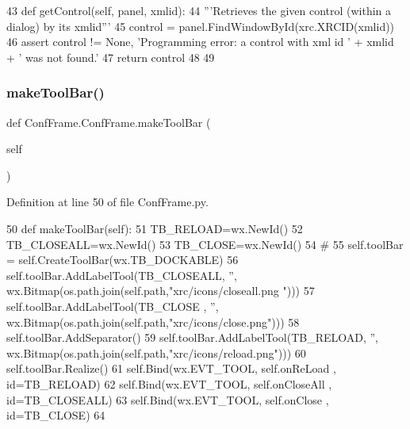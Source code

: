 \begin{DoxyCode}
43     \textcolor{keyword}{def }getControl(self, panel, xmlid):
44         \textcolor{stringliteral}{'''Retrieves the given control (within a dialog) by its xmlid'''}
45         control = panel.FindWindowById(xrc.XRCID(xmlid))
46         \textcolor{keyword}{assert} control != \textcolor{keywordtype}{None}, \textcolor{stringliteral}{'Programming error: a control with xml id '} + xmlid + \textcolor{stringliteral}{' was not found.'}
47         \textcolor{keywordflow}{return} control
48 
49         
\end{DoxyCode}
\mbox{\label{classConfFrame_1_1ConfFrame_ace0a1296b1331409d28e0751101e31d3}} 
\subsubsection{\texorpdfstring{make\+Tool\+Bar()}{makeToolBar()}}
{\footnotesize\ttfamily def Conf\+Frame.\+Conf\+Frame.\+make\+Tool\+Bar (\begin{DoxyParamCaption}\item[{}]{self }\end{DoxyParamCaption})}



Definition at line 50 of file Conf\+Frame.\+py.


\begin{DoxyCode}
50     \textcolor{keyword}{def }makeToolBar(self):
51         TB\_RELOAD=wx.NewId()
52         TB\_CLOSEALL=wx.NewId()
53         TB\_CLOSE=wx.NewId()
54         \textcolor{comment}{#}
55         self.toolBar = self.CreateToolBar(wx.TB\_DOCKABLE)
56         self.toolBar.AddLabelTool(TB\_CLOSEALL, \textcolor{stringliteral}{''}, wx.Bitmap(os.path.join(self.path,\textcolor{stringliteral}{"xrc/icons/closeall.png
      "})))
57         self.toolBar.AddLabelTool(TB\_CLOSE  , \textcolor{stringliteral}{''}, wx.Bitmap(os.path.join(self.path,\textcolor{stringliteral}{"xrc/icons/close.png"})))
58         self.toolBar.AddSeparator()        
59         self.toolBar.AddLabelTool(TB\_RELOAD, \textcolor{stringliteral}{''}, wx.Bitmap(os.path.join(self.path,\textcolor{stringliteral}{"xrc/icons/reload.png"})))
60         self.toolBar.Realize()
61         self.Bind(wx.EVT\_TOOL, self.onReLoad , id=TB\_RELOAD)
62         self.Bind(wx.EVT\_TOOL, self.onCloseAll , id=TB\_CLOSEALL)
63         self.Bind(wx.EVT\_TOOL, self.onClose , id=TB\_CLOSE)
64 
\end{DoxyCode}
\mbox{\label{classConfFrame_1_1ConfFrame_a1f922c19035b3f3a5039ee438c3d4e36}} 
